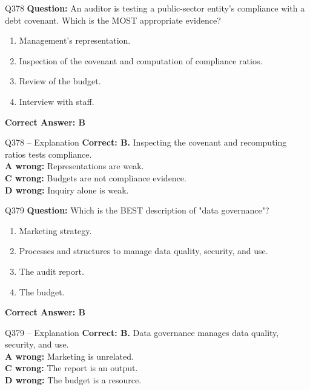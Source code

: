\documentclass[aspectratio=169,10pt]{beamer}
\begin{document}
	\begin{frame}[t]{Q378}
		\small
		\textbf{Question:} An auditor is testing a public-sector entity's compliance with a debt covenant. Which is the MOST appropriate evidence?
		\begin{enumerate}[label=\Alph*.,itemsep=1pt,topsep=2pt]
			\item Management's representation.
			\item Inspection of the covenant and computation of compliance ratios.
			\item Review of the budget.
			\item Interview with staff.
		\end{enumerate}
		\vspace{4pt}
		\textbf{Correct Answer: B}
	\end{frame}
	
	\begin{frame}[t]{Q378 -- Explanation}
		\small
		\textbf{Correct: B.} Inspecting the covenant and recomputing ratios tests compliance. \\[4pt]
		\textbf{A wrong:} Representations are weak. \\[2pt]
		\textbf{C wrong:} Budgets are not compliance evidence. \\[2pt]
		\textbf{D wrong:} Inquiry alone is weak.
	\end{frame}
	
	\begin{frame}[t]{Q379}
		\small
		\textbf{Question:} Which is the BEST description of "data governance"?
		\begin{enumerate}[label=\Alph*.,itemsep=1pt,topsep=2pt]
			\item Marketing strategy.
			\item Processes and structures to manage data quality, security, and use.
			\item The audit report.
			\item The budget.
		\end{enumerate}
		\vspace{4pt}
		\textbf{Correct Answer: B}
	\end{frame}
	
	\begin{frame}[t]{Q379 -- Explanation}
		\small
		\textbf{Correct: B.} Data governance manages data quality, security, and use. \\[4pt]
		\textbf{A wrong:} Marketing is unrelated. \\[2pt]
		\textbf{C wrong:} The report is an output. \\[2pt]
		\textbf{D wrong:} The budget is a resource.
	\end{frame}
	
\end{document}
